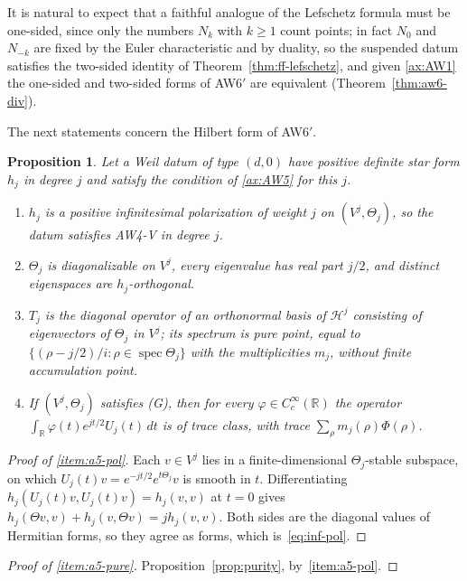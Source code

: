 \documentclass[11pt]{amsart}
\theoremstyle{plain}
\newtheorem{proposition}[theorem]{Proposition}
\theoremstyle{definition}
\theoremstyle{remark}
\numberwithin{equation}{section}
\newcommand{\R}{\mathbb{R}}
\newcommand{\cH}{\mathscr{H}}
\DeclareMathOperator{\spec}{spec}
\begin{document}
It is natural to expect that a faithful analogue of the Lefschetz
formula must be one-sided, since only the numbers $N_k$ with $k\ge1$
count points; in fact $N_0$ and $N_{-k}$ are fixed by the Euler
characteristic and by duality, so the suspended datum satisfies the
two-sided identity of Theorem~\ref{thm:ff-lefschetz}, and given
\ref{ax:AW1} the one-sided and two-sided forms of AW6$'$ are
equivalent (Theorem~\ref{thm:aw6-div}).

The next statements concern the Hilbert form of AW6$'$.

\begin{proposition}\label{prop:aw5-contains}
Let a Weil datum of type $(d,0)$ have positive definite star form $h_j$
in degree $j$ and satisfy the condition of \ref{ax:AW5} for this $j$.
\begin{enumerate}[label=(\roman*)]
\item\label{item:a5-pol} $h_j$ is a positive infinitesimal polarization
  of weight $j$ on $(V^j,\Theta_j)$, so the datum satisfies AW4-V
  in degree $j$.
\item\label{item:a5-pure} $\Theta_j$ is diagonalizable on $V^j$, every
  eigenvalue has real part $j/2$, and distinct eigenspaces are
  $h_j$-orthogonal.
\item\label{item:a5-spec} $T_j$ is the diagonal operator of an
  orthonormal basis of $\cH^j$ consisting of eigenvectors of $\Theta_j$
  in $V^j$; its spectrum is pure point, equal to
  $\{(\rho-j/2)/i:\rho\in\spec\Theta_j\}$ with the multiplicities
  $m_j$, without finite accumulation point.
\item\label{item:a5-trace} If $(V^j,\Theta_j)$ satisfies (G), then for
  every $\varphi\in C_c^\infty(\R)$ the operator
  $\int_\R\varphi(t)e^{jt/2}U_j(t)\,dt$ is of trace class, with
  trace $\sum_\rho m_j(\rho)\Phi(\rho)$.
\end{enumerate}
\end{proposition}

\begin{proof}[Proof of \ref{item:a5-pol}]
Each $v\in V^j$ lies in a finite-dimensional $\Theta_j$-stable subspace,
on which $U_j(t)v=e^{-jt/2}e^{t\Theta_j}v$ is smooth in $t$.
Differentiating $h_j(U_j(t)v,U_j(t)v)=h_j(v,v)$ at $t=0$ gives
$h_j(\Theta v,v)+h_j(v,\Theta v)=jh_j(v,v)$. Both sides are the
diagonal values of Hermitian forms, so they agree as forms,
which is~\eqref{eq:inf-pol}.
\end{proof}

\begin{proof}[Proof of \ref{item:a5-pure}]
Proposition~\ref{prop:purity}, by~\ref{item:a5-pol}.
\end{proof}
\end{document}
